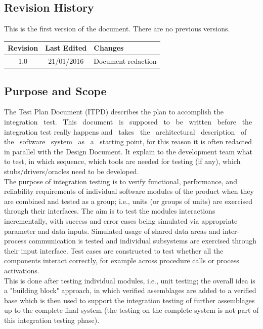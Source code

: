 \documentclass[a4paper,11pt]{report} %
\begin{document}
	\subsection{Revision History}
		This is the first version of the document. There are no previous versions.
		
		\begin{center}
			\begin{tabular}{| l | p{2.5cm} | p{9cm} |}\hline
				\multicolumn{1}{|c|}{\textbf{Revision}} & \multicolumn{1}{|c|}{\textbf{Last Edited}} & \textbf{Changes}\\\hline
				\multicolumn{1}{|c|}{1.0} & \multicolumn{1}{|c|}{21/01/2016} & Document redaction\\\hline
			\end{tabular}
		\end{center}
		
	\subsection{Purpose and Scope}
		The Test Plan Document (ITPD) describes the plan to accomplish the  integration  test.  This  document  is  supposed  to  be  written  before  the  integration  test  really  happens and  takes  the  architectural  description  of  the  software  system  as  a  starting point, for this reason it is often redacted in parallel with the Design Document. It explain to the development team what to test, in which sequence, which tools are needed for testing (if any), which stubs/drivers/oracles need to be developed.\\		
		The purpose of integration testing is to verify functional, performance, and reliability requirements of individual software modules of the product when they are combined and tested as a group; i.e., units (or groups of units) are exercised through their interfaces. The aim is to test the modules interactions incrementally, with success and error cases being simulated via appropriate parameter and data inputs. Simulated usage of shared data areas and inter-process communication is tested and individual subsystems are exercised through their input interface. Test cases are constructed to test whether all the components interact correctly, for example across procedure calls or process activations.\\
		This is done after testing individual modules, i.e., unit testing; the overall idea is a "building block" approach, in which verified assemblages are added to a verified base which is then used to support the integration testing of further assemblages up to the complete final system (the testing on the complete system is not part of this integration testing phase).
		
\end{document}
